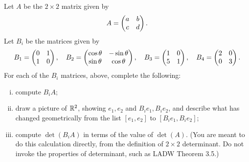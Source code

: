 \begin{question}
    \normalfont


    Let $A$ be the $2\times2$ matrix given by
    \begin{align*}
        A = \begin{pmatrix} a &b\\ c &d \end{pmatrix}.
    \end{align*}
    Let $B_i$ be the matrices given by
    \begin{align*}
        B_1 = \begin{pmatrix} 0 &1\\ 1 &0 \end{pmatrix},\ \ \
        B_2 = \begin{pmatrix} \cos\theta &-\sin\theta\\ \sin\theta &\cos\theta \end{pmatrix},\ \ \
        B_3 = \begin{pmatrix} 1 &0\\ 5 &1 \end{pmatrix},\ \ \
        B_4 = \begin{pmatrix} 2 &0\\ 0 &3 \end{pmatrix}.
    \end{align*}
    For each of the $B_i$ matrices, above, complete the following:
    \begin{enumerate}[(i)]
        \item compute $B_iA$;
        \item draw a picture of ${\mathbb R}^2$, showing $e_1, e_2$ and $B_ie_1, B_ie_2$, and describe what has changed geometrically from the list $[e_1, e_2]$ to $[B_ie_1, B_ie_2]$;
        \item compute $\det(B_iA)$ in terms of the value of $\det(A)$.  (You are meant to do this calculation directly, from the definition of $2\times2$ determinant. Do not invoke the properties of determinant, such as LADW Theorem 3.5.)
    \end{enumerate}
\end{question}